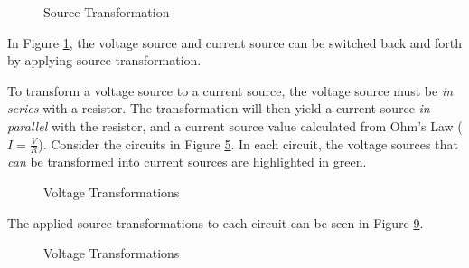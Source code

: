 \documentclass[12pt]{article}
\begin{document}
\begin{figure}[H]
  \vspace{-10pt}
  \centering
  
  \caption{Source Transformation}
  \label{fig:014}
  \vspace{-10pt}
\end{figure}

In Figure \ref{fig:014}, the voltage source and current source can be switched back and forth by applying source transformation.

To transform a voltage source to a current source, the voltage source must be \textit{in series} with a resistor. The transformation will then yield a current source \textit{in parallel} with the resistor, and a current source value calculated from Ohm's Law ($I = \frac{V}{R}$). Consider the circuits in Figure \ref{fig:voltageTransformations}. In each circuit, the voltage sources that \textit{can} be transformed into current sources are highlighted in {\color{gr} green}.

\begin{figure}[H]
  \centering
  \begin{subfigure}[H]{0.3\textwidth}
    \centering
    
    \caption{}
    \label{fig:034}
  \end{subfigure}
  \begin{subfigure}[H]{0.3\textwidth}
    \centering
    
    \caption{}
    \label{fig:035}
  \end{subfigure}
  \begin{subfigure}[H]{0.3\textwidth}
    \centering
    
    \caption{}
    \label{fig:036}
  \end{subfigure}
  \caption{Voltage Transformations}
  \label{fig:voltageTransformations}
\end{figure}

The applied source transformations to each circuit can be seen in Figure \ref{fig:voltageTransformationsAfter}.

\begin{figure}[H]
  \centering
  \begin{subfigure}[H]{0.3\textwidth}
    \centering
    
    \caption{}
    \label{fig:037}
  \end{subfigure}
  \begin{subfigure}[H]{0.3\textwidth}
    \centering
    
    \caption{}
    \label{fig:038}
  \end{subfigure}
  \begin{subfigure}[H]{0.3\textwidth}
    \centering
    
    \caption{}
    \label{fig:039}
  \end{subfigure}
  \caption{Voltage Transformations}
  \label{fig:voltageTransformationsAfter}
  \vspace{-10pt}
\end{figure}
\end{document}
